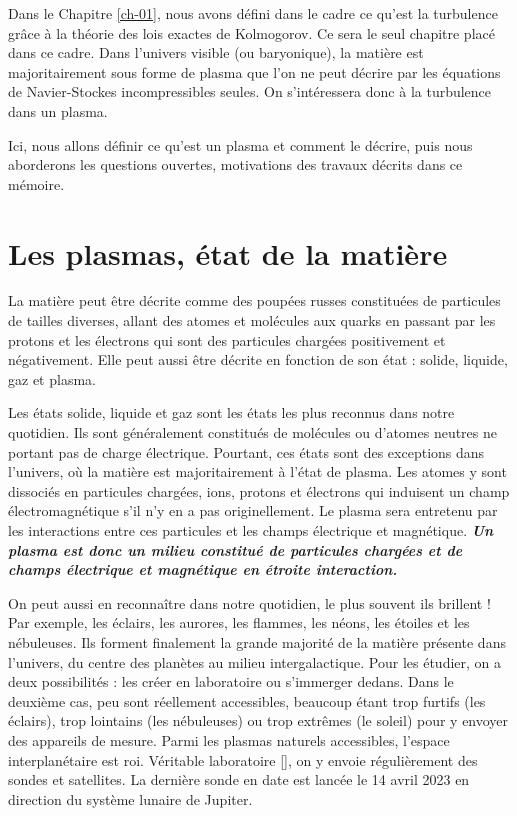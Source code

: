 Dans le Chapitre \ref{ch-01}, nous avons défini dans le cadre  ce qu'est la turbulence grâce à la théorie des lois exactes de Kolmogorov. Ce sera le seul chapitre placé dans ce cadre. Dans l'univers visible (ou baryonique), la matière est majoritairement sous forme de plasma que l'on ne peut décrire par les équations de Navier-Stockes incompressibles seules. On s'intéressera donc à la turbulence dans un plasma. 

Ici, nous allons définir ce qu'est un plasma et comment le décrire, puis nous aborderons les questions ouvertes, motivations des travaux décrits dans ce mémoire. 

\section{Les plasmas, état de la matière} \label{sec-021}

La matière peut être décrite comme des poupées russes constituées de particules de tailles diverses, allant des atomes et molécules aux quarks en passant par les protons et les électrons qui sont des particules chargées positivement et négativement. Elle peut aussi être décrite en fonction de son état : solide, liquide, gaz et plasma. 

Les états solide, liquide et gaz sont les états les plus reconnus dans notre quotidien. Ils sont généralement constitués de molécules ou d'atomes neutres ne portant pas de charge électrique. Pourtant, ces états sont des exceptions dans l'univers, où la matière est majoritairement à l'état de plasma. Les atomes y sont dissociés en particules chargées, ions, protons et électrons qui induisent un champ électromagnétique s'il n'y en a pas originellement. Le plasma sera entretenu par les interactions entre ces particules et les champs électrique et magnétique. \textbf{\emph{Un plasma est donc un milieu constitué de particules chargées et de champs électrique et magnétique en étroite interaction.}}

On peut aussi en reconnaître dans notre quotidien, le plus souvent ils brillent ! Par exemple, les éclairs, les aurores, les flammes, les néons, les étoiles et les nébuleuses. Ils forment finalement la grande majorité de la matière présente dans l'univers, du centre des planètes au milieu intergalactique. Pour les étudier, on a deux possibilités : les créer en laboratoire ou s'immerger dedans. Dans le deuxième cas, peu sont réellement accessibles, beaucoup étant trop furtifs (les éclairs), trop lointains (les nébuleuses) ou trop extrêmes (le soleil) pour y envoyer des appareils de mesure. Parmi les plasmas naturels accessibles, l'espace interplanétaire est roi. Véritable laboratoire [\cite{bruno_solar_2005}], on y envoie régulièrement des sondes et satellites. La dernière sonde en date est  lancée le 14 avril 2023 en direction du système lunaire de Jupiter. 

